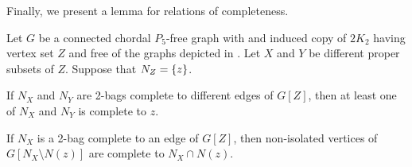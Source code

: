 Finally, we present a lemma for relations of completeness.

\begin{lemma}
    \label{lem:neighborhoods_chordal_comp}
    Let $G$ be a connected chordal $P_5$-free graph with and induced copy of
    $2K_2$ having vertex set $Z$ and free of the graphs depicted in
    . Let $X$ and $Y$ be different proper
    subsets of $Z$. Suppose that $N_Z=\left\{z\right\}$.
    \begin{lemenum}
        \item If $N_X$ and $N_Y$ are 2-bags complete to different edges of
            $G[Z]$, then at least one of $N_X$ and $N_Y$ is complete to $z$.
            \label{lem:chordal_comp_1}
        \item If $N_X$ is a 2-bag complete to an edge of $G[Z]$, then
            non-isolated vertices of $G[N_X\setminus N(z)]$ are complete to
            $N_X\cap N(z)$. \label{lem:chordal_comp_2}
    \end{lemenum}
\end{lemma}

